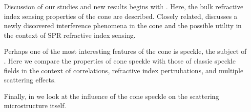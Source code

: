 Discussion of our studies and new results begins with .
Here, the bulk refractive index sensing properties of the cone are
described.  Closely related,  discusses a newly
discovered interference phenomena in the cone and the possible utility in
the context of SPR refractive index sensing.

Perhaps one of the most interesting features of the cone is speckle, the
subject of .  Here we compare the properties of cone
speckle with those of classic speckle fields in the context of
correlations, refractive index pertrubations, and multiple scattering
effects.

Finally, in  we look at the influence of the
cone speckle on the scattering microstructure itself.
